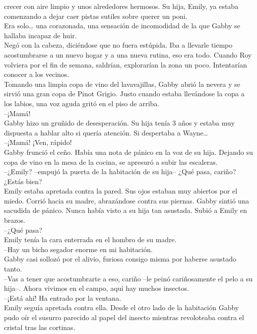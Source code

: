 {crecer con aire limpio y unos alrededores hermosos. Su hija, Emily, ya
estaba comenzando a dejar caer pistas sutiles sobre querer un poni.\\
Era solo\ldots{} una corazonada, una sensación de incomodidad de la que
Gabby se hallaba incapaz de huir.\\
Negó con la cabeza, diciéndose que no fuera estúpida. Iba a llevarle
tiempo acostumbrarse a un nuevo hogar y a una nueva rutina, eso era
todo. Cuando Roy volviera por el fin de semana, saldrían, explorarían la
zona un poco. Intentarían conocer a los vecinos.\\
Tomando una limpia copa de vino del lavavajillas, Gabby abrió la nevera
y se sirvió una gran copa de Pinot Grigio. Justo cuando estaba
llevándose la copa a los labios, una voz aguda gritó en el piso de
arriba.\\
--¡Mamá!\\
Gabby hizo un gruñido de desesperación. Su hija tenía 3 años y estaba
muy dispuesta a hablar alto si quería atención. Si despertaba a
Wayne\ldots{}\\
--¡Mamá! ¡Ven, rápido!\\
Gabby frunció el ceño. Había una nota de pánico en la voz de su hija.
Dejando su copa de vino en la mesa de la cocina, se apresuró a subir las
escaleras.\\
--¿Emily? --empujó la puerta de la habitación de su hija-- ¿Qué pasa,
cariño? ¿Estás bien?\\
Emily estaba apretada contra la pared. Sus ojos estaban muy abiertos por
el miedo. Corrió hacia su madre, abrazándose contra sus piernas. Gabby
sintió una sacudida de pánico. Nunca había visto a su hija tan asustada.
Subió a Emily en brazos.\\
--¿Qué pasa?\\
Emily tenía la cara enterrada en el hombro de su madre.\\
--Hay un bicho segador enorme en mi habitación.\\
Gabby casi sollozó por el alivio, furiosa consigo misma por haberse
asustado tanto.\\
--Vas a tener que acostumbrarte a eso, cariño --le peinó cariñosamente
el pelo a su hija--. Ahora vivimos en el campo, aquí hay muchos
insectos.\\
--¡Está ahí! Ha entrado por la ventana.\\
Emily seguía apretada contra ella. Desde el otro lado de la habitación
Gabby pudo oír el susurro parecido al papel del insecto mientras
revoloteaba contra el cristal tras las cortinas.\\
}

